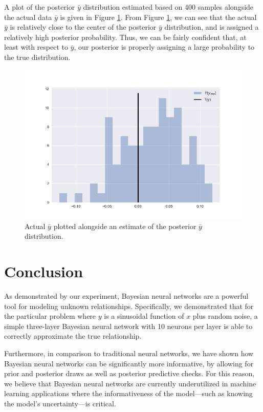 \documentclass[
    preprint,
    12pt,
    letterpaper,
    longbibliography,
    nofootinbib,
    amsmath,
    amssymb,
    amsfonts,
]{revtex4-1}
\begin{document}
A plot of the posterior $\bar y$ distribution estimated based on 400 samples alongside the actual data $\bar y$ is given in Figure \ref{fig:5}. From Figure \ref{fig:5}, we can see that the actual $\bar y$ is relatively close to the center of the posterior $\bar y$ distribution, and is assigned a relatively high posterior probability. Thus, we can be fairly confident that, at least with respect to $\bar y$, our posterior is properly assigning a large probability to the true distribution.

\begin{figure}
\includegraphics[scale=0.8]{Figure_5.png}
\caption{Actual $\bar y$ plotted alongside an estimate of the posterior $\bar y$ distribution.}
\label{fig:5}
\end{figure}

\section{Conclusion}

As demonstrated by our experiment, Bayesian neural networks are a powerful tool for modeling unknown relationships. Specifically, we demonstrated that for the particular problem where $y$ is a sinusoidal function of $x$ plus random noise, a simple three-layer Bayesian neural network with 10 neurons per layer is able to correctly approximate the true relationship.

Furthermore, in comparison to traditional neural networks, we have shown how Bayesian neural networks can be significantly more informative, by allowing for prior and posterior draws as well as posterior predictive checks. For this reason, we believe that Bayesian neural networks are currently underutilized in machine learning applications where the informativeness of the model---such as knowing the model's uncertainty---is critical.


\end{document}
